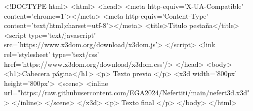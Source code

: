 <!DOCTYPE html>
<html>
<head>
<meta http-equiv='X-UA-Compatible' content='chrome=1'></meta>
<meta http-equiv='Content-Type' content='text/html;charset=utf-8'></meta>
<title>Titulo pestaña</title>
<script type='text/javascript' src='https://www.x3dom.org/download/x3dom.js'> </script>
<link rel='stylesheet' type='text/css' href='https://www.x3dom.org/download/x3dom.css'/>
</head>
<body>
<h1>Cabecera página</h1>
<p>
    Texto previo
</p>
<x3d width='800px' height='800px'>
<scene>
<inline url="https://raw.githubusercontent.com/EGA2024/Nefertiti/main/nefert3d.x3d"> </inline>
</scene>
</x3d>
<p>
    Texto final
</p>
  </body>
</html>
